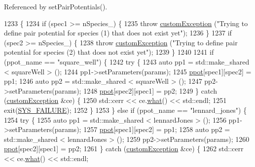 Referenced by set\-Pair\-Potentials().


\begin{DoxyCode}
1233                                                                                                            
                                                \{
1234     \textcolor{keywordflow}{if} (spec1 >= nSpecies\_) \{
1235         \textcolor{keywordflow}{throw} \hyperlink{classcustom_exception}{customException} (\textcolor{stringliteral}{"Trying to define pair potential for species (1) that does
       not exist yet"});
1236     \}
1237     \textcolor{keywordflow}{if} (spec2 >= nSpecies\_) \{
1238         \textcolor{keywordflow}{throw} \hyperlink{classcustom_exception}{customException} (\textcolor{stringliteral}{"Trying to define pair potential for species (2) that does
       not exist yet"});
1239     \}
1240 
1241     \textcolor{keywordflow}{if} (ppot\_name == \textcolor{stringliteral}{"square\_well"}) \{
1242         \textcolor{keywordflow}{try} \{
1243             \textcolor{keyword}{auto} pp1 = std::make\_shared < squareWell > ();
1244             pp1->setParameters(params);
1245             \hyperlink{classsim_system_ad2e290b5963f132e6a3a56cee35c8e9f}{ppot}[spec1][spec2] = pp1;
1246             \textcolor{keyword}{auto} pp2 = std::make\_shared < squareWell > ();
1247             pp2->setParameters(params);
1248             \hyperlink{classsim_system_ad2e290b5963f132e6a3a56cee35c8e9f}{ppot}[spec2][spec1] = pp2;
1249         \} \textcolor{keywordflow}{catch} (\hyperlink{classcustom_exception}{customException} &ce) \{
1250             std::cerr << ce.\hyperlink{classcustom_exception_aeb6ab5848b038adfc68fde86a512f691}{what}() << std::endl;
1251             exit(\hyperlink{global_8h_a428dfe1ef0a6ff4b1fdebf275f6aff2e}{SYS\_FAILURE});
1252         \}
1253     \} \textcolor{keywordflow}{else} \textcolor{keywordflow}{if} (ppot\_name == \textcolor{stringliteral}{"lennard\_jones"}) \{
1254         \textcolor{keywordflow}{try} \{
1255             \textcolor{keyword}{auto} pp1 = std::make\_shared < lennardJones > ();
1256             pp1->setParameters(params);
1257             \hyperlink{classsim_system_ad2e290b5963f132e6a3a56cee35c8e9f}{ppot}[spec1][spec2] = pp1;
1258             \textcolor{keyword}{auto} pp2 = std::make\_shared < lennardJones > ();
1259             pp2->setParameters(params);
1260             \hyperlink{classsim_system_ad2e290b5963f132e6a3a56cee35c8e9f}{ppot}[spec2][spec1] = pp2;
1261         \} \textcolor{keywordflow}{catch} (\hyperlink{classcustom_exception}{customException} &ce) \{
1262             std::cerr << ce.\hyperlink{classcustom_exception_aeb6ab5848b038adfc68fde86a512f691}{what}() << std::endl;

\end{DoxyCode}
